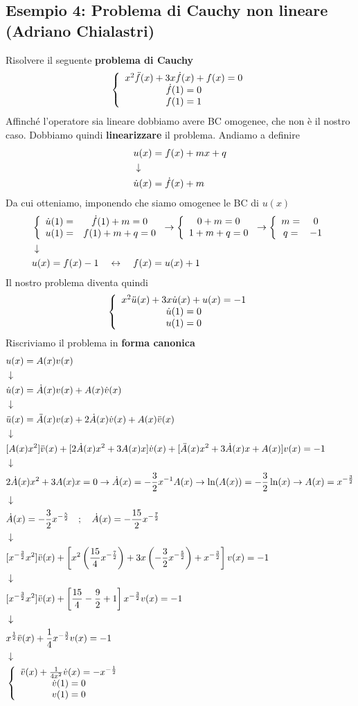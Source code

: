 \subsection{Esempio 4: Problema di Cauchy non lineare (Adriano Chialastri)}
Risolvere il seguente \textbf{problema di Cauchy}
\begin{align}
	\left\{ \begin{array}{ccc} x^2 \ddot{f}(x) + 3x \dot{f}(x) + f(x) = 0\\ \dot{f}(1)=0\\ f(1) =1 \end{array} \right.
\end{align}
Affinché l'operatore sia lineare dobbiamo avere BC omogenee, che non è il nostro caso. Dobbiamo quindi \textbf{linearizzare} il problema. Andiamo a definire
\begin{align}
	&u(x) = f(x) + mx + q\\ &\downarrow \nonumber \\
	&\dot{u}(x) = \dot{f}(x) + m
\end{align}	
Da cui otteniamo, imponendo che siamo omogenee le BC di $u(x)$
\begin{align}
	&\left\{ \begin{array}{cc} \dot{u}(1) =& \dot{f}(1) + m =0\\ u(1) =& f(1) + m + q=0 \end{array} \right. \to \left\{ \begin{array}{cc} 0 + m=0 \\ 1 + m + q=0 \end{array} \right. \to \left\{ \begin{array}{cc} m=& 0\\ q=& -1 \end{array} \right. \\ &\downarrow \nonumber \\
	&u(x) = f(x) -1 \quad \leftrightarrow \quad f(x) = u(x)+1
\end{align}	
Il nostro problema diventa quindi
\begin{align}
	\left\{ \begin{array}{ccc} x^2 \ddot{u}(x) + 3x \dot{u}(x) + u(x) = -1\\ \dot{u}(1)=0\\ u(1) = 0 \end{array} \right.
\end{align}
Riscriviamo il problema in \textbf{forma canonica}
\begin{align}
	&u(x) = A(x)v(x)\\ &\downarrow \nonumber \\
	&\dot{u}(x) = \dot{A}(x) v(x) + A(x) \dot{v}(x)\nonumber \\ &\downarrow \nonumber \\
	&\ddot{u}(x) = \ddot{A}(x) v(x) + 2\dot{A}(x) \dot{v}(x) + A(x) \ddot{v}(x)\nonumber \\ &\downarrow \nonumber \\
	&[A(x) x^2] \ddot{v}(x) + [2\dot{A}(x) x^2 + 3A(x)x ]\dot{v}(x) + [\ddot{A}(x)x^2 + 3\dot{A}(x)x + A(x)]v(x) = -1 \nonumber \\ &\downarrow \nonumber \\
	&2\dot{A}(x) x^2 + 3A(x)x=0 \to \dot{A}(x) = -\frac{3}{2}x^{-1}A(x) \to \ln(A(x)) = -\frac{3}{2} \ln(x)  \to A(x)= x^{-\frac{3}{2}} \nonumber \\ &\downarrow \nonumber \\
	&\dot{A}(x) = -\frac{3}{2}x^{-\frac{5}{2}} \quad ; \quad \dot{A}(x) = -\frac{15}{2}x^{-\frac{7}{2}} \nonumber \\ &\downarrow \nonumber \\
	&[x^{-\frac{3}{2}} x^2] \ddot{v}(x) + \left[x^2\left( \frac{15}{4}x^{-\frac{7}{2}} \right) + 3x \left( -\frac{3}{2} x^{-\frac{5}{2}} \right) + x^{-\frac{3}{2}} \right] v(x) = -1 \nonumber \\ &\downarrow \nonumber \\
	&[x^{-\frac{3}{2}} x^2] \ddot{v}(x) + \left[\frac{15}{4} -\frac{9}{2} +1 \right] x^{-\frac{3}{2}} v(x) = -1 \nonumber \\ &\downarrow \nonumber \\
	&x^{\frac{1}{2}} \ddot{v}(x) + \frac{1}{4}x^{-\frac{3}{2}} v(x) = -1 \nonumber \\ &\downarrow \nonumber \\
	&\left\{ \begin{array}{ccc} \ddot{v}(x) + \frac{1}{4x^2} \dot{v}(x)  = -x ^{-\frac{1}{2}}\\ \dot{v}(1)=0\\ v(1) = 0 \end{array} \right.
\end{align}
